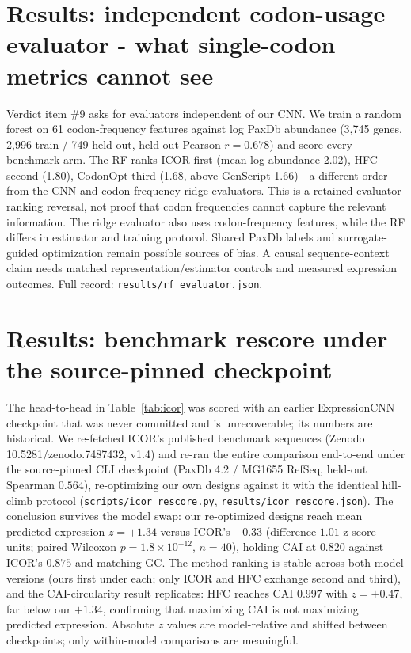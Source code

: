 \documentclass[11pt]{article}
\begin{document}
\section{Results: independent codon-usage evaluator - what single-codon metrics cannot see}
Verdict item \#9 asks for evaluators independent of our CNN. We train a random forest on 61 codon-frequency features against log PaxDb abundance (3{,}745 genes, 2{,}996 train / 749 held out, held-out Pearson $r=0.678$) and score every benchmark arm. The RF ranks ICOR first (mean log-abundance 2.02), HFC second (1.80), CodonOpt third (1.68, above GenScript 1.66) - a different order from the CNN and codon-frequency ridge evaluators. This is a retained evaluator-ranking reversal, not proof that codon frequencies cannot capture the relevant information. The ridge evaluator also uses codon-frequency features, while the RF differs in estimator and training protocol. Shared PaxDb labels and surrogate-guided optimization remain possible sources of bias. A causal sequence-context claim needs matched representation/estimator controls and measured expression outcomes. Full record: \texttt{results/rf\_evaluator.json}.

\section{Results: benchmark rescore under the source-pinned checkpoint}
The head-to-head in Table~\ref{tab:icor} was scored with an earlier ExpressionCNN
checkpoint that was never committed and is unrecoverable; its numbers are
historical. We re-fetched ICOR's published benchmark sequences (Zenodo
10.5281/zenodo.7487432, v1.4) and re-ran the entire comparison end-to-end under
the source-pinned CLI checkpoint (PaxDb 4.2 / MG1655 RefSeq, held-out Spearman
$0.564$), re-optimizing our own designs against it with the identical hill-climb
protocol (\texttt{scripts/icor\_rescore.py}, \texttt{results/icor\_rescore.json}).
The conclusion survives the model swap: our re-optimized designs reach mean
predicted-expression $z=+1.34$ versus ICOR's $+0.33$ (difference $1.01$ z-score units; paired
Wilcoxon $p=1.8\times10^{-12}$, $n=40$), holding CAI at $0.820$ against ICOR's
$0.875$ and matching GC. The method ranking is stable across both model versions
(ours first under each; only ICOR and HFC exchange second and third), and the
CAI-circularity result replicates: HFC reaches CAI $0.997$ with $z=+0.47$, far
below our $+1.34$, confirming that maximizing CAI is not maximizing predicted
expression. Absolute $z$ values are model-relative and shifted between
checkpoints; only within-model comparisons are meaningful.
\end{document}
